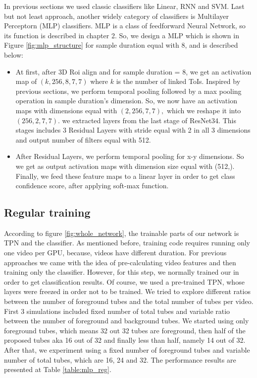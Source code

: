 \documentclass{report}
\begin{document}
In previous sections we used classic classifiers like Linear, RNN and SVM. Last but not least approach,
another widely category of classifiers  is Multilayer Perceptorn (MLP) classifiers. MLP is a class of
feedforward Neural Network, so its function is described in chapter 2.
So, we design a MLP which is shown in Figure \ref{fig:mlp_structure} for sample duration equal with 8, and is described below:
\begin{itemize}
\item At first,  after 3D Roi align and for sample duration = 8, we get an activation map of $(k,256,8,7,7)$ where $k$ is the
  number of linked ToIs. Inspired by previous sections, we perform temporal pooling followed by a max pooling operation in
  sample duration's dimension. So, we now have an activation maps with dimensions equal with $(2,256,7,7),$ which we reshape
  it into $(256,2,7,7).$ 
 we extracted layers from the last stage of ResNet34. This stages includes 3 Residual Layers
  with stride equal with 2 in all 3 dimensions and output number of filters equal with 512.

\item After Residual Layers, we perform temporal pooling for x-y dimensions. So we get as output activation maps with dimension size
  equal with (512,).  Finally, we feed these feature maps to a linear layer in order to get class confidence score, after applying
  soft-max function.

\end{itemize}

\subsection{Regular training}
According to figure \ref{fig:whole_network}, the trainable parts of our network is TPN and the classifier.
As mentioned before, training code requires running only one video per GPU, because, videos have different duration. For previous approaches
we came with the idea of pre-calculating video features and then training only the classifier. However, for this step, we normally trained our
in order to get classification results. Of course, we used a pre-trained TPN, whose layers were freezed in order not to be trained.
We tried to explore different ratios between the number of foreground tubes and the total number of tubes per video. First 3 simulations included
fixed number of total tubes and variable ratio between the number of foreground and background tubes. We started using only foreground tubes, which
means 32 out 32 tubes are foreground, then half of the proposed tubes aka 16 out of 32 and finally less than half, namely 14 out of 32. After that,
we experiment using a fixed number of foreground tubes and variable number of total tubes, which are 16, 24 and 32. The performance results are presented
at Table \ref{table:mlp_reg}.
\end{document}
